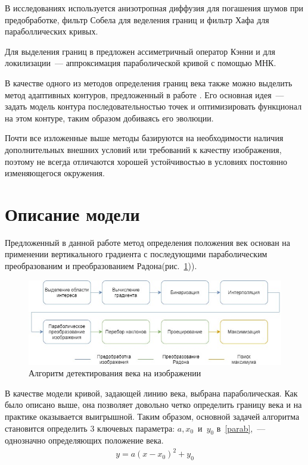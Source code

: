 \documentclass[12pt]{article} %
\begin{document}
В исследованиях \cite{Adam_2, Adam_1} используется анизотропная диффузия для погашения шумов при предобработке, фильтр Собела для веделения границ и фильтр Хафа для параболлических кривых. 

Для выделения границ в \cite{Yang} предложен ассиметричный оператор Кэнни и для локилизации~--- аппроксимация параболической кривой с помощью МНК. 

В качестве одного из методов определения границ века также можно выделить метод адаптивных контуров, предложенный в работе \cite{Smirn}. Его основная идея~--- задать модель контура последовательностью точек и оптимизировать функционал на этом контуре, таким образом добиваясь его эволюции.

Почти все изложенные выше методы базируются на необходимости наличия дополнительных внешних условий или требований к качеству изображения, поэтому не всегда отличаются хорошей устойчивостью в условиях постоянно изменяющегося окружения. 


\newpage
\section{Описание модели}

 Предложенный в данной работе метод определения положения век основан на применении вертикального градиента с последующими параболическим преобразованим и преобразованием Радона(рис.~\ref{fig:map})).

\begin{figure}[h]
	
	\centering
	
	\includegraphics[width=0.8\linewidth]{map.jpg}
	
	\caption{Алгоритм детектирования века на изображении}
	
	\label{fig:map}
	
\end{figure}

В качестве модели кривой, задающей линию века, выбрана параболическая. Как было описано выше, она позволяет довольно четко определить границу века и на практике оказывается выигрышной. Таким образом, основной задачей алгоритма становится определить 3 ключевых параметра: $a, x_0$~и~$y_0$ в~\ref{parab},~--- однозначно определяющих положение века.
\begin{gather}\label{parab}
	y = a(x-x_0)^2 + y_0
\end{gather}
\end{document}
